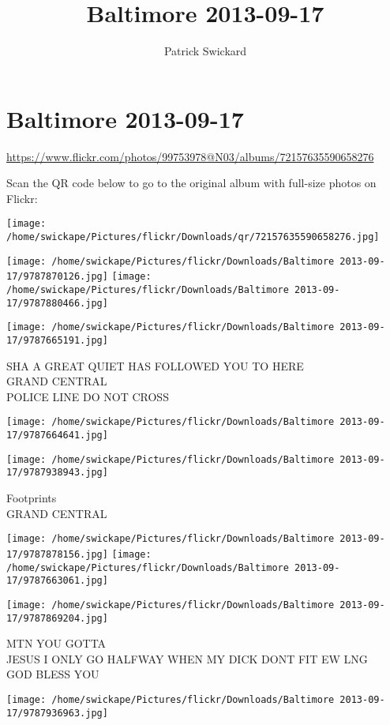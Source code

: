 \documentclass[10pt,letterpaper]{article}
\title{Baltimore 2013-09-17}
\author{Patrick Swickard}
\date{}
\begin{document}
\section*{Baltimore 2013-09-17}

\url{https://www.flickr.com/photos/99753978@N03/albums/72157635590658276}

Scan the QR code below to go to the original album with full-size photos on Flickr:

\texttt{[image: /home/swickape/Pictures/flickr/Downloads/qr/72157635590658276.jpg]}
\pagebreak

\texttt{[image: /home/swickape/Pictures/flickr/Downloads/Baltimore 2013-09-17/9787870126.jpg]}
\texttt{[image: /home/swickape/Pictures/flickr/Downloads/Baltimore 2013-09-17/9787880466.jpg]}

\vspace{0.25in}
\texttt{[image: /home/swickape/Pictures/flickr/Downloads/Baltimore 2013-09-17/9787665191.jpg]}

SHA A GREAT QUIET HAS FOLLOWED YOU TO HERE\\
GRAND CENTRAL\\
POLICE LINE DO NOT CROSS
\pagebreak

\texttt{[image: /home/swickape/Pictures/flickr/Downloads/Baltimore 2013-09-17/9787664641.jpg]}

\vspace{0.25in}
\texttt{[image: /home/swickape/Pictures/flickr/Downloads/Baltimore 2013-09-17/9787938943.jpg]}

Footprints\\
GRAND CENTRAL
\pagebreak

\texttt{[image: /home/swickape/Pictures/flickr/Downloads/Baltimore 2013-09-17/9787878156.jpg]}
\texttt{[image: /home/swickape/Pictures/flickr/Downloads/Baltimore 2013-09-17/9787663061.jpg]}

\vspace{0.25in}
\texttt{[image: /home/swickape/Pictures/flickr/Downloads/Baltimore 2013-09-17/9787869204.jpg]}

MTN YOU GOTTA\\
JESUS I ONLY GO HALFWAY WHEN MY DICK DONT FIT EW LNG\\
GOD BLESS YOU
\pagebreak

\texttt{[image: /home/swickape/Pictures/flickr/Downloads/Baltimore 2013-09-17/9787936963.jpg]}
\end{document}
